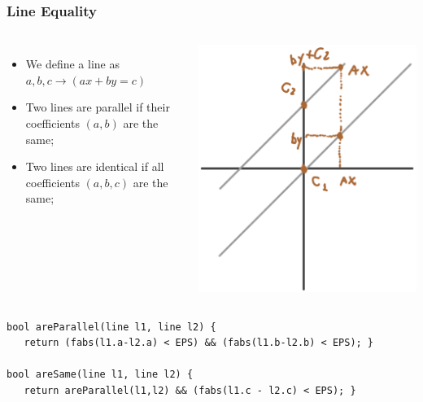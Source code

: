 \begin{frame}[fragile]
  \frametitle{Line Equality}
    \begin{columns}
      \begin{itemize}
      \item We define a line as $a,b,c \to (ax+by=c)$

      \item Two lines are parallel if their coefficients $(a, b)$ are the same;\medskip

      \item Two lines are identical if all coefficients $(a,b,c)$ are the same;
      \end{itemize}
      \includegraphics[width=.6\textwidth]{../img/geom3}
    \end{columns}
  \begin{exampleblock}{}
\begin{verbatim}
bool areParallel(line l1, line l2) {
   return (fabs(l1.a-l2.a) < EPS) && (fabs(l1.b-l2.b) < EPS); }

bool areSame(line l1, line l2) {
   return areParallel(l1,l2) && (fabs(l1.c - l2.c) < EPS); }
\end{verbatim}
  \end{exampleblock}
\end{frame}


